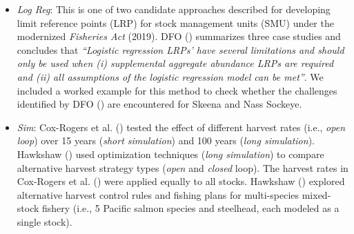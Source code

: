 \documentclass[french,11pt]{book}
\begin{document}
\begin{itemize}
\item
  \emph{Log Reg}: This is one of two candidate approaches described for developing limit reference points (LRP) for stock management units (SMU) under the modernized \emph{Fisheries Act} (2019). DFO () summarizes three case studies and concludes that \emph{``Logistic regression LRPs' have several limitations and should only be used when (i) supplemental aggregate abundance LRPs are required and (ii) all assumptions of the logistic regression model can be met''}. We included a worked example for this method to check whether the challenges identified by DFO () are encountered for Skeena and Nass Sockeye.
\item
  \emph{Sim}: Cox-Rogers et al. () tested the effect of different harvest rates (i.e., \emph{open loop}) over 15 years (\emph{short simulation}) and 100 years (\emph{long simulation}). Hawkshaw () used optimization techniques (\emph{long simulation}) to compare alternative harvest strategy types (\emph{open} and \emph{closed} loop). The harvest rates in Cox-Rogers et al. () were applied equally to all stocks. Hawkshaw () explored alternative harvest control rules and fishing plans for multi-species mixed-stock fishery (i.e., 5 Pacific salmon species and steelhead, each modeled as a single stock).
\end{itemize}
\clearpage
\end{document}
